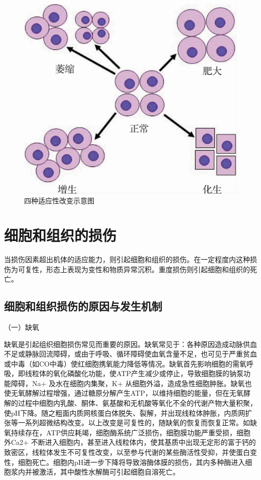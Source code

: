 \begin{figure}[!htbp]
	\centering
    \includegraphics{./images/Image00005.jpg}
	\caption{四种适应性改变示意图}
	\label{fig1-4} 
	\end{figure} 

\section{细胞和组织的损伤}

当损伤因素超出机体的适应能力，则引起细胞和组织的损伤。在一定程度内这种损伤为可复性，形态上表现为变性和物质异常沉积。重度损伤则引起细胞和组织的死亡。

\subsection{细胞和组织损伤的原因与发生机制}

{（一）缺氧}

缺氧是引起组织细胞损伤常见而重要的原因。缺氧常见于：各种原因造成动脉供血不足或静脉回流障碍，或由于呼吸、循环障碍使血氧含量不足，也可见于严重贫血或中毒（如CO中毒）使红细胞携氧能力降低等情况。缺氧首先影响细胞的需氧呼吸，即线粒体的氧化磷酸化功能，使ATP产生减少或停止，导致细胞膜的钠泵功能障碍，Na{+}
及水在细胞内集聚，K{+}
从细胞外溢，造成急性细胞肿胀。缺氧也使无氧酵解过程增强，通过糖原分解产生ATP，以维持细胞的能量，但在无氧酵解的过程中细胞内乳酸、酮体、氨基酸和无机酸等氧化不全的代谢产物大量积聚，使pH下降。随之粗面内质网核蛋白体脱失、裂解，并出现线粒体肿胀，内质网扩张等一系列超微结构改变。以上改变是可复性的，随缺氧的恢复而恢复正常。如缺氧持续存在，ATP供应耗竭，细胞酶系统广泛损伤，细胞膜功能严重受损，细胞外Ca{2+}
不断进入细胞内，甚至进入线粒体内，使其基质中出现无定形的富于钙的致密区，线粒体发生不可复性改变，以至参与代谢的某些酶活性受抑，并使蛋白变性，细胞死亡。细胞内pH进一步下降将导致溶酶体膜的损伤，其内多种酶进入细胞浆内并被激活，其中酸性水解酶可引起细胞自溶死亡。

